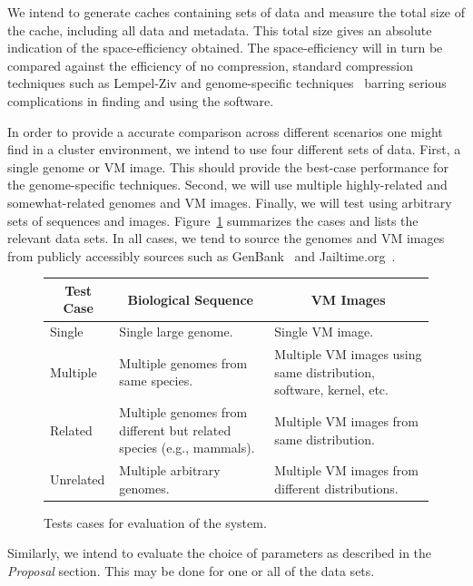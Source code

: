 \documentclass{article}[12pt]
\begin{document}
We intend to generate caches containing sets of data and measure the total size
of the cache, including all data and metadata.  This total size gives an
absolute indication of the space-efficiency obtained.  The space-efficiency
will in turn be compared against the efficiency of no compression, standard
compression techniques such as Lempel-Ziv and genome-specific
techniques~\cite{statistical} barring serious complications in finding and
using the software.

In order to provide a accurate comparison across different scenarios one might
find in a cluster environment, we intend to use four different sets of data.
First, a single genome or VM image.  This should provide the best-case
performance for the genome-specific techniques.  Second, we will use multiple
highly-related and somewhat-related genomes and VM images.  Finally, we will
test using arbitrary sets of sequences and images.  Figure~\ref{fig:cases}
summarizes the cases and lists the relevant data sets.  In all cases, we tend
to source the genomes and VM images from publicly accessibly sources such as
GenBank~\cite{genbank} and Jailtime.org~\cite{jailtime}.

\begin{figure}
\begin{center}
\begin{tabular}{|l|l|l|}
\hline
\multicolumn{1}{|c}{Test Case} & \multicolumn{1}{|c|}{Biological Sequence} & \multicolumn{1}{c|}{VM Images} \\
\hline
Single       & Single large genome. & Single VM image. \\
\hline
Multiple     & \parbox{2in}{Multiple genomes from same species.} & \parbox{2in}{Multiple VM images using same distribution, software, kernel, etc.} \\
\hline
Related      & \parbox{2in}{Multiple genomes from different but related species (e.g., mammals).} & \parbox{2in}{Multiple VM images from same distribution.} \\
\hline
Unrelated    & \parbox{2in}{Multiple arbitrary genomes.} & \parbox{2in}{Multiple VM images from different distributions.} \\
\hline
\end{tabular}
\end{center}
\caption{Tests cases for evaluation of the system.}
\label{fig:cases}
\end{figure}

Similarly, we intend to evaluate the choice of parameters as described in the
{\em Proposal} section.  This may be done for one or all of the data sets.
\end{document}
